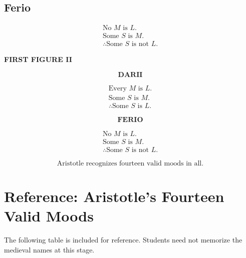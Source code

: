 \documentclass[11pt]{article}
\begin{document}
\subsection{Ferio}

\[
\begin{array}{l}
\text{No }M\text{ is }L.\\
\text{Some }S\text{ is }M.\\
\hline
\therefore\text{Some }S\text{ is not }L.
\end{array}
\]

\begin{whiteboard}
\textbf{FIRST FIGURE II}

\[
\textbf{DARII}
\]

\[
\begin{array}{l}
\text{Every }M\text{ is }L.\\
\text{Some }S\text{ is }M.\\
\hline
\therefore\text{Some }S\text{ is }L.
\end{array}
\]

\vspace{0.5em}

\[
\textbf{FERIO}
\]

\[
\begin{array}{l}
\text{No }M\text{ is }L.\\
\text{Some }S\text{ is }M.\\
\hline
\therefore\text{Some }S\text{ is not }L.
\end{array}
\]

\[
\boxed{\text{Aristotle recognizes fourteen valid moods in all.}}
\]
\end{whiteboard}

\section{Reference: Aristotle's Fourteen Valid Moods}

The following table is included for reference.
Students need not memorize the medieval names at this stage.
\end{document}
